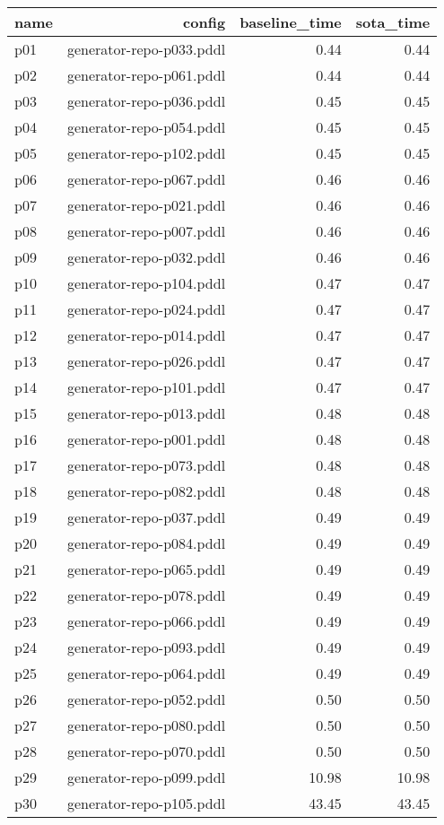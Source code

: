 \documentclass{article}
\begin{document}
                            \begin{center}
                            \scriptsize
                            \begin{tabular}{@{}l|r|r|r@{}}
                            name & config & baseline\_time & sota\_time\\\midrule
                              p01& generator-repo-p033.pddl&0.44&0.44\\
  p02& generator-repo-p061.pddl&0.44&0.44\\
  p03& generator-repo-p036.pddl&0.45&0.45\\
  p04& generator-repo-p054.pddl&0.45&0.45\\
  p05& generator-repo-p102.pddl&0.45&0.45\\
  p06& generator-repo-p067.pddl&0.46&0.46\\
  p07& generator-repo-p021.pddl&0.46&0.46\\
  p08& generator-repo-p007.pddl&0.46&0.46\\
  p09& generator-repo-p032.pddl&0.46&0.46\\
  p10& generator-repo-p104.pddl&0.47&0.47\\
  p11& generator-repo-p024.pddl&0.47&0.47\\
  p12& generator-repo-p014.pddl&0.47&0.47\\
  p13& generator-repo-p026.pddl&0.47&0.47\\
  p14& generator-repo-p101.pddl&0.47&0.47\\
  p15& generator-repo-p013.pddl&0.48&0.48\\
  p16& generator-repo-p001.pddl&0.48&0.48\\
  p17& generator-repo-p073.pddl&0.48&0.48\\
  p18& generator-repo-p082.pddl&0.48&0.48\\
  p19& generator-repo-p037.pddl&0.49&0.49\\
  p20& generator-repo-p084.pddl&0.49&0.49\\
  p21& generator-repo-p065.pddl&0.49&0.49\\
  p22& generator-repo-p078.pddl&0.49&0.49\\
  p23& generator-repo-p066.pddl&0.49&0.49\\
  p24& generator-repo-p093.pddl&0.49&0.49\\
  p25& generator-repo-p064.pddl&0.49&0.49\\
  p26& generator-repo-p052.pddl&0.50&0.50\\
  p27& generator-repo-p080.pddl&0.50&0.50\\
  p28& generator-repo-p070.pddl&0.50&0.50\\
  p29& generator-repo-p099.pddl&10.98&10.98\\
  p30& generator-repo-p105.pddl&43.45&43.45
                            \end{tabular}
                            \end{center}
                    
\end{document}
